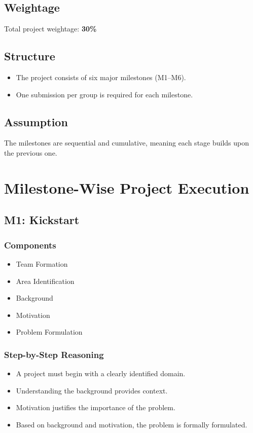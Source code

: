\documentclass[12pt]{article}
\begin{document}
\subsection{Weightage}
Total project weightage: \textbf{30\%}

\subsection{Structure}
\begin{itemize}
    \item The project consists of six major milestones (M1--M6).
    \item One submission per group is required for each milestone.
\end{itemize}

\subsection{Assumption}
The milestones are sequential and cumulative, meaning each stage builds upon the previous one.

\section{Milestone-Wise Project Execution}

\subsection{M1: Kickstart}

\subsubsection{Components}
\begin{itemize}
    \item Team Formation
    \item Area Identification
    \item Background
    \item Motivation
    \item Problem Formulation
\end{itemize}

\subsubsection{Step-by-Step Reasoning}
\begin{itemize}
    \item A project must begin with a clearly identified domain.
    \item Understanding the background provides context.
    \item Motivation justifies the importance of the problem.
    \item Based on background and motivation, the problem is formally formulated.
\end{itemize}
\end{document}
